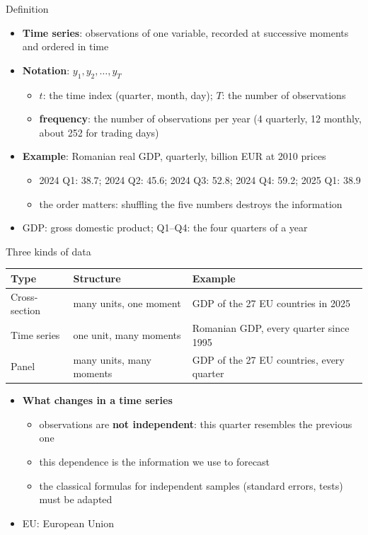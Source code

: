 \begin{frame}{Definition}
\itemsize{\small}
\begin{itemize}
    \item \textbf{Time series}: observations of one variable, recorded at successive moments and ordered in time
    \item \textbf{Notation}: $y_1, y_2, \ldots, y_T$
    \begin{itemize}
        \item $t$: the time index (quarter, month, day); $T$: the number of observations
        \item \textbf{frequency}: the number of observations per year (4 quarterly, 12 monthly, about 252 for trading days)
    \end{itemize}
    \item \textbf{Example}: Romanian real GDP, quarterly, billion EUR at 2010 prices
    \begin{itemize}
        \item 2024 Q1: 38.7; 2024 Q2: 45.6; 2024 Q3: 52.8; 2024 Q4: 59.2; 2025 Q1: 38.9
        \item the order matters: shuffling the five numbers destroys the information
    \end{itemize}
    \item GDP: gross domestic product; Q1--Q4: the four quarters of a year
\end{itemize}
\end{frame}

\begin{frame}{Three kinds of data}
\itemsize{\footnotesize}
\begin{center}
\footnotesize
\begin{tabular}{>{\raggedright\arraybackslash}p{2.6cm}>{\raggedright\arraybackslash}p{4.2cm}>{\raggedright\arraybackslash}p{5.4cm}}
\toprule
\textbf{Type} & \textbf{Structure} & \textbf{Example} \\
\midrule
Cross-section & many units, one moment & GDP of the 27 EU countries in 2025 \\
Time series & one unit, many moments & Romanian GDP, every quarter since 1995 \\
Panel & many units, many moments & GDP of the 27 EU countries, every quarter \\
\bottomrule
\end{tabular}
\end{center}
\begin{itemize}
    \item \textbf{What changes in a time series}
    \begin{itemize}
        \item observations are \textbf{not independent}: this quarter resembles the previous one
        \item this dependence is the information we use to forecast
        \item the classical formulas for independent samples (standard errors, tests) must be adapted
    \end{itemize}
    \item EU: European Union
\end{itemize}
\end{frame}

